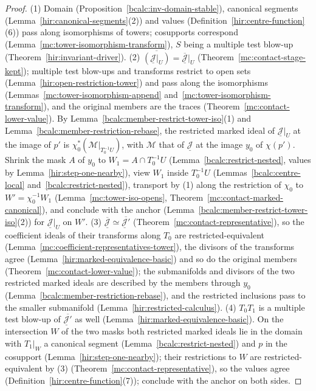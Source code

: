 \begin{proof}
\leanok
(1) Domain (Proposition~\ref{bcalc:inv-domain-stable}), canonical segments (Lemma~\ref{hir:canonical-segments}(2)) and values (Definition~\ref{hir:centre-function}(6)) pass
along isomorphisms of towers; cosupports correspond (Lemma~\ref{mc:tower-isomorphism-transform}), \(S\) being a multiple test blow-up (Theorem~\ref{hir:invariant-driver}).
(2) \(\overline{(\underline{\mathcal J}|_U)}=\overline{\underline{\mathcal J}}|_U\) (Theorem~\ref{mc:contact-stage-kept}); multiple test blow-ups and transforms restrict to
open sets (Lemma~\ref{hir:open-restriction-tower}) and pass along the isomorphisms (Lemmas~\ref{mc:tower-isomorphism-append} and~\ref{mc:tower-isomorphism-transform}), and
the original members are the traces (Theorem~\ref{mc:contact-lower-value}). By Lemma~\ref{bcalc:member-restrict-tower-iso}(1) and
Lemma~\ref{bcalc:member-restriction-rebase}, the restricted marked ideal of \(\underline{\mathcal J}|_U\) at the image of \(p'\) is \(\chi_0^*(\mathcal M|_{T_0^{-1}U})\), with
\(\mathcal M\) that of \(\underline{\mathcal J}\) at the image \(y_0\) of \(\chi(p')\). Shrink the mask \(A\) of \(y_0\) to \(W_1=A\cap T_0^{-1}U\)
(Lemma~\ref{bcalc:restrict-nested}, values by Lemma~\ref{hir:step-one-nearby}), view \(W_1\) inside \(T_0^{-1}U\) (Lemmas~\ref{bcalc:centre-local}
and~\ref{bcalc:restrict-nested}), transport by (1) along the restriction of \(\chi_0\) to \(W'=\chi_0^{-1}W_1\) (Lemma~\ref{mc:tower-iso-opens},
Theorem~\ref{mc:contact-marked-canonical}), and conclude with the anchor (Lemma~\ref{bcalc:member-restrict-tower-iso}(2)) for \(\underline{\mathcal J}|_U\) on \(W'\).
(3) \(\overline{\underline{\mathcal J}}\simeq\overline{\underline{\mathcal J}'}\) (Theorem~\ref{mc:contact-representative}), so the coefficient ideals of their transforms along
\(T_0\) are restricted-equivalent (Lemma~\ref{mc:coefficient-representatives-tower}), the divisors of the transforms agree (Lemma~\ref{hir:marked-equivalence-basic}) and
so do the original members (Theorem~\ref{mc:contact-lower-value}); the submanifolds and divisors of the two restricted marked ideals are described by the members through
\(y_0\) (Lemma~\ref{bcalc:member-restriction-rebase}), and the restricted inclusions pass to the smaller submanifold (Lemma~\ref{hir:restricted-calculus}).
(4) \(T_0T_1\) is a multiple test blow-up of \(\overline{\underline{\mathcal J}'}\) as well (Lemma~\ref{hir:marked-equivalence-basic}). On the intersection \(W\) of the two
masks both restricted marked ideals lie in the domain with \(T_1|_W\) a canonical segment (Lemma~\ref{bcalc:restrict-nested}) and \(p\) in the cosupport
(Lemma~\ref{hir:step-one-nearby}); their restrictions to \(W\) are restricted-equivalent by (3) (Theorem~\ref{mc:contact-representative}), so the values agree
(Definition~\ref{hir:centre-function}(7)); conclude with the anchor on both sides.
\end{proof}

